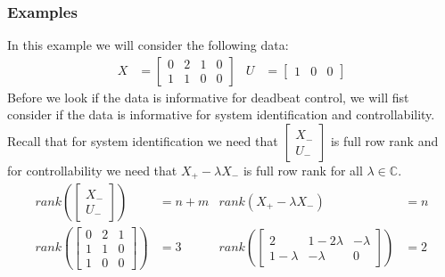 \subsubsection{Examples}
In this example we will consider the following data:
\begin{align*} X &= \begin{bmatrix} 0&2&1&0\\1&1&0&0 \end{bmatrix} & U &= \begin{bmatrix} 1&0&0 \end{bmatrix}\end{align*} 
Before we look if the data is informative for deadbeat control, we will fist consider if the data is informative for system identification and controllability. Recall that for system identification we need that $\begin{bmatrix} X_- \\ U_- \end{bmatrix}$ is full row rank and for controllability we need that $X_+ - \lambda X_-$ is full row rank for all $\lambda \in \mathbb{C}$.
\begin{align*}
rank(\begin{bmatrix} X_- \\ U_- \end{bmatrix}) &= n + m & rank(X_+ - \lambda X_-) &= n \\
rank(\begin{bmatrix} 0&2&1\\1&1&0\\1&0&0 \end{bmatrix}) &= 3 & rank(\begin{bmatrix} 2&1 - 2\lambda &-\lambda\\1-\lambda&-\lambda&0 \end{bmatrix}) &= 2
\end{align*}

